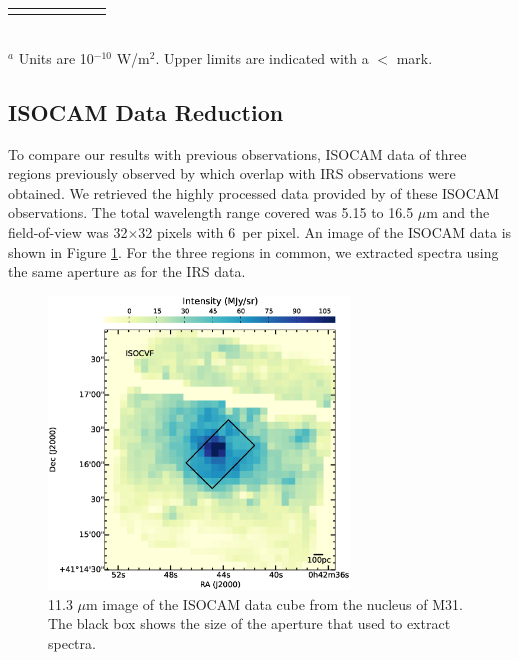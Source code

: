 \begin{table}
\begin{minipage}{100mm}
\begin{tabular}{l c c  c  c  c  c  }
\hline
 \label{Atomic}
\end{tabular}\\
{ $^a$ Units are 10$^{-10}$ W/m$^2$. Upper limits are indicated with a $<$ mark.  }
\end{minipage}
\end{table}



\subsection{ISOCAM Data Reduction}


To compare our results with previous observations, ISOCAM data of three regions previously observed by \citet{1998Cesarsky} which overlap with IRS observations were obtained. We retrieved the highly processed data provided by \citet{Boulanger_F_2005} of these ISOCAM observations. The total wavelength range covered was 5.15 to 16.5 $\mu$m and the field-of-view was 32$\times $32 pixels with 6\arcsec\ per pixel. An image of the ISOCAM data is shown in Figure \ref{isonuc}.  For the three regions in common, we extracted spectra using the same aperture as for the IRS data. 


\begin{figure}
\centering
\includegraphics[width = 8cm]{./isonuc.eps}
\caption{11.3 $\mu$m image of the ISOCAM data cube from the nucleus of M31. The black box shows the size of the aperture that used to extract spectra.}
\label{isonuc}
\end{figure}
